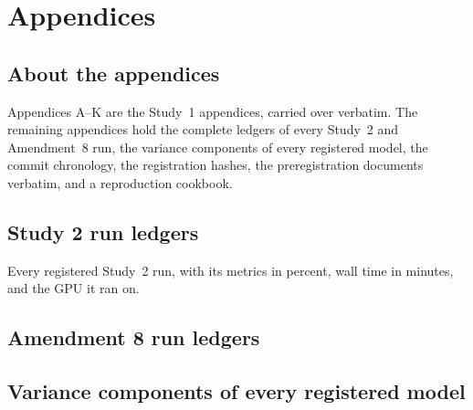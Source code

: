 \part{Appendices}
\appendix

\chapter*{About the appendices}
Appendices A--K are the Study~1 appendices, carried over verbatim. The remaining appendices hold the complete ledgers of
every Study~2 and Amendment~8 run, the variance components of every registered model, the commit chronology, the
registration hashes, the preregistration documents verbatim, and a reproduction cookbook.














\chapter{Study 2 run ledgers}
\label{r:app:ledgers}
Every registered Study~2 run, with its metrics in percent, wall time in minutes, and the GPU it ran on.






\chapter{Amendment 8 run ledgers}
\label{r:app:ledgers-a8}








\chapter{Variance components of every registered model}
\label{r:app:varcomp}

